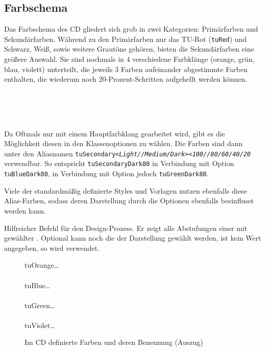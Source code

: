 \subsection{Farbschema}

Das Farbschema des CD gliedert sich grob in zwei Kategorien: Primärfarben
und Sekundärfarben. Während zu den Primärfarben nur das TU-Rot (\texttt{tuRed})
und Schwarz, Weiß, sowie weitere Grautöne gehören, bieten die Sekundärfarben
eine größere Auswahl. Sie sind nochmals in 4 verschiedene Farbklänge
(orange, grün, blau, violett) unterteilt, die jeweils 3 Farben aufeinander
abgestimmte Farben enthalten, die wiederum noch 20-Prozent-Schritten aufgehellt
werden können.

\begin{Declaration}
  \\
  \\
  \\
\end{Declaration}

Da Oftmals nur mit einem Hauptfarbklang gearbeitet wird, gibt es die Möglichkeit
diesen in den Klassenoptionen zu wählen. Die Farben sind dann unter den
Aliasnamen
\texttt{tuSecondary\textit{<Light//Medium/Dark>}\textit{<100//80/60/40/20}}
verwendbar.
So entspricht \texttt{tuSecondaryDark80} in Verbindung mit Option
 \texttt{tuBlueDark80}, in Verbindung mit Option 
jedoch \texttt{tuGreenDark80}.

Viele der standardmäßig definierte Styles und Vorlagen nutzen ebenfalls diese
Alias-Farben, sodass deren Darstellung durch die Optionen ebenfalls beeinflusst 
werden kann.

\begin{Declaration}
\end{Declaration}

Hilfreicher Befehl für den Design-Prozess. Er zeigt alle Abstufungen
einer   mit gewählter 
 .
Optional kann noch die  der Darstellung gewählt werden,
ist kein Wert angegeben, so wird  verwendet.

\begin{figure}
  tuOrange\ldots\\
  \\[-1ex]
  tuBlue\ldots\\
  \\[-1ex]
  tuGreen\ldots\\
  \\[-1ex]
  tuViolet\ldots\\
  \caption{Im CD definierte Farben und deren Benennung (Auszug)}
\end{figure}


